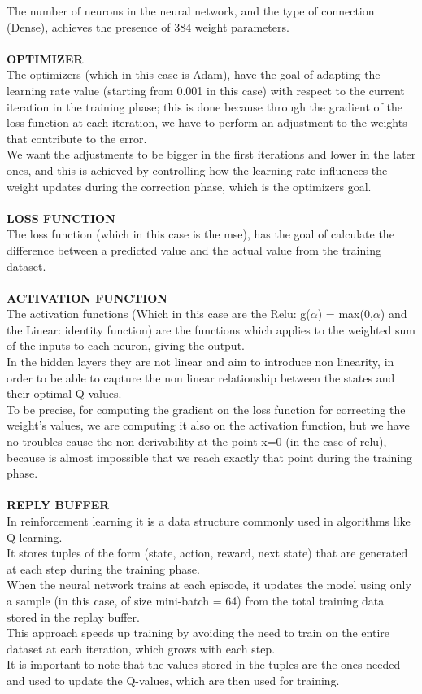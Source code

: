 \documentclass{article}
\begin{document}
The number of neurons in the neural network, and the type of connection (Dense), achieves the presence of 384 weight parameters.
\\
\\
\textbf{OPTIMIZER}
\\
The optimizers (which in this case is Adam), have the goal of adapting the learning rate value (starting from 0.001 in this case) with respect to the current iteration in the training phase; this is done because through the gradient of the loss function at each iteration, we have to perform an adjustment to the weights that contribute to the error.
\\
We want the adjustments to be bigger in the first iterations and lower in the later ones, and this is achieved by controlling how the learning rate influences the weight updates during the correction phase, which is the optimizers goal.
\\
\\
\textbf{LOSS FUNCTION}
\\
The loss function (which in this case is the mse), has the goal of calculate the difference between a predicted value and the actual value from the training dataset.
\\
\\
\textbf{ACTIVATION FUNCTION}
\\
The activation functions (Which in this case are the Relu: g($\alpha$) = max(0,$\alpha$) and the Linear: identity function) are the functions which applies to the weighted sum of the inputs to each neuron, giving the output.
\\
In the hidden layers they are not linear and aim to introduce non linearity, in order to be able to capture the non linear relationship between the states and their optimal Q values.
\\
To be precise, for computing the gradient on the loss function for correcting the weight's values, we are computing it also on the activation function, but we have no troubles cause the non derivability at the point x=0 (in the case of relu), because is almost impossible that we reach exactly that point during the training phase.
\\
\\
\textbf{REPLY BUFFER}
\\
In reinforcement learning it is a data structure commonly used in algorithms like Q-learning.
\\
It stores tuples of the form (state, action, reward, next state) that are generated at each step during the training phase.
\\
When the neural network trains at each episode, it updates the model using only a sample (in this case, of size mini-batch = 64) from the total training data stored in the replay buffer. 
\\
This approach speeds up training by avoiding the need to train on the entire dataset at each iteration, which grows with each step.
\\
It is important to note that the values stored in the tuples are the ones needed and used to update the Q-values, which are then used for training.
\end{document}
